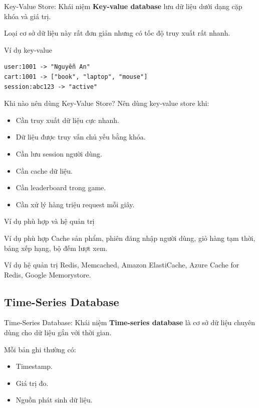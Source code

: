 \documentclass[aspectratio=169,11pt]{beamer}
\newcommand{\keyword}[1]{\textcolor{accent}{\textbf{#1}}}
\newcommand{\kw}[1]{\keyword{#1}}
\newcommand{\smallitem}{\setlength{\itemsep}{2pt}\setlength{\parskip}{0pt}}
\begin{document}
\begin{frame}{Key-Value Store: Khái niệm}
\kw{Key-value database} lưu dữ liệu dưới dạng cặp khóa và giá trị.

\vspace{2mm}
Loại cơ sở dữ liệu này rất đơn giản nhưng có tốc độ truy xuất rất nhanh.
\end{frame}

\begin{frame}[fragile]{Ví dụ key-value}
\small
\begin{verbatim}
user:1001 -> "Nguyễn An"
cart:1001 -> ["book", "laptop", "mouse"]
session:abc123 -> "active"
\end{verbatim}
\end{frame}

\begin{frame}{Khi nào nên dùng Key-Value Store?}
Nên dùng key-value store khi:
\begin{itemize}
  \smallitem
  \item Cần truy xuất dữ liệu cực nhanh.
  \item Dữ liệu được truy vấn chủ yếu bằng khóa.
  \item Cần lưu session người dùng.
  \item Cần cache dữ liệu.
  \item Cần leaderboard trong game.
  \item Cần xử lý hàng triệu request mỗi giây.
\end{itemize}
\end{frame}

\begin{frame}{Ví dụ phù hợp và hệ quản trị}
\begin{block}{Ví dụ phù hợp}
Cache sản phẩm, phiên đăng nhập người dùng, giỏ hàng tạm thời, bảng xếp hạng, bộ đếm lượt xem.
\end{block}

\begin{block}{Ví dụ hệ quản trị}
Redis, Memcached, Amazon ElastiCache, Azure Cache for Redis, Google Memorystore.
\end{block}
\end{frame}

\subsection{Time-Series Database}

\begin{frame}{Time-Series Database: Khái niệm}
\kw{Time-series database} là cơ sở dữ liệu chuyên dùng cho dữ liệu gắn với thời gian.

\vspace{2mm}
Mỗi bản ghi thường có:
\begin{itemize}
  \smallitem
  \item Timestamp.
  \item Giá trị đo.
  \item Nguồn phát sinh dữ liệu.
\end{itemize}
\end{frame}
\end{document}
